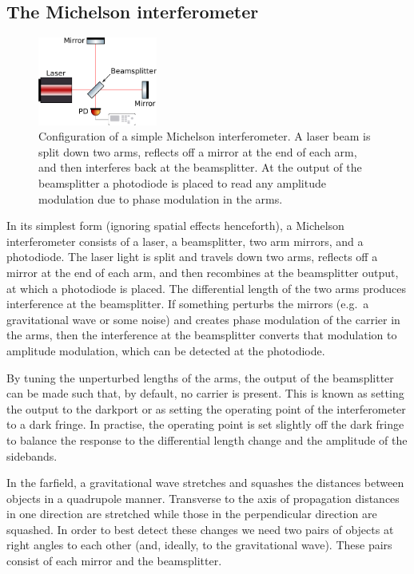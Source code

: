 \documentclass[aps,pra,superscriptaddress,reprint,nofootinbib]{revtex4-1}
\begin{document}
\subsection{The Michelson interferometer}

\begin{figure}[ht]
	\begin{center}
	\includegraphics[width=0.35\textwidth]{figures/Michelson_interferometer.pdf}
	\end{center}
	\caption{Configuration of a simple Michelson interferometer. A laser beam is split down two arms, reflects off a mirror at the end of each arm, and then interferes back at the beamsplitter. At the output of the beamsplitter a photodiode is placed to read any amplitude modulation due to phase modulation in the arms.}
	\label{fig:Michelson}
\end{figure}

In its simplest form (ignoring spatial effects henceforth), a Michelson interferometer consists of a laser, a beamsplitter, two arm mirrors, and a photodiode. The laser light is split and travels down two arms, reflects off a mirror at the end of each arm, and then recombines at the beamsplitter output, at which a photodiode is placed. The differential length of the two arms produces interference at the beamsplitter.
If something perturbs the mirrors (e.g.\ a gravitational wave or some noise) and creates phase modulation of the carrier in the arms, then the interference at the beamsplitter converts that modulation to amplitude modulation, which can be detected at the photodiode.


By tuning the unperturbed lengths of the arms, the output of the beamsplitter can be made such that, by default, no carrier is present. This is known as setting the output to the darkport or as setting the operating point of the interferometer to a dark fringe. In practise, the operating point is set slightly off the dark fringe to balance the response to the differential length change and the amplitude of the sidebands.


In the farfield, a gravitational wave stretches and squashes the distances between objects in a quadrupole manner. Transverse to the axis of propagation distances in one direction are stretched while those in the perpendicular direction are squashed. In order to best detect these changes we need two pairs of objects at right angles to each other (and, ideally, to the gravitational wave). These pairs consist of each mirror and the beamsplitter.
\end{document}

